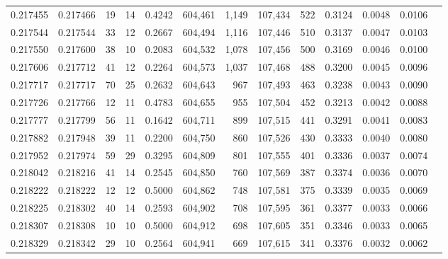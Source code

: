 \begin{tabular}{rrrrrrrrrrrrr}
0.217455 & 0.217466 &    19 &  14 &                                     0.4242 & 604,461 &   1,149 & 107,434 &     522 & 0.3124 & 0.0048 & 0.0106 \\
0.217544 & 0.217544 &    33 &  12 &                                     0.2667 & 604,494 &   1,116 & 107,446 &     510 & 0.3137 & 0.0047 & 0.0103 \\
0.217550 & 0.217600 &    38 &  10 &                                     0.2083 & 604,532 &   1,078 & 107,456 &     500 & 0.3169 & 0.0046 & 0.0100 \\
0.217606 & 0.217712 &    41 &  12 &                                     0.2264 & 604,573 &   1,037 & 107,468 &     488 & 0.3200 & 0.0045 & 0.0096 \\
0.217717 & 0.217717 &    70 &  25 &                                     0.2632 & 604,643 &     967 & 107,493 &     463 & 0.3238 & 0.0043 & 0.0090 \\
0.217726 & 0.217766 &    12 &  11 &                                     0.4783 & 604,655 &     955 & 107,504 &     452 & 0.3213 & 0.0042 & 0.0088 \\
0.217777 & 0.217799 &    56 &  11 &                                     0.1642 & 604,711 &     899 & 107,515 &     441 & 0.3291 & 0.0041 & 0.0083 \\
0.217882 & 0.217948 &    39 &  11 &                                     0.2200 & 604,750 &     860 & 107,526 &     430 & 0.3333 & 0.0040 & 0.0080 \\
0.217952 & 0.217974 &    59 &  29 &                                     0.3295 & 604,809 &     801 & 107,555 &     401 & 0.3336 & 0.0037 & 0.0074 \\
0.218042 & 0.218216 &    41 &  14 &                                     0.2545 & 604,850 &     760 & 107,569 &     387 & 0.3374 & 0.0036 & 0.0070 \\
0.218222 & 0.218222 &    12 &  12 &                                     0.5000 & 604,862 &     748 & 107,581 &     375 & 0.3339 & 0.0035 & 0.0069 \\
0.218225 & 0.218302 &    40 &  14 &                                     0.2593 & 604,902 &     708 & 107,595 &     361 & 0.3377 & 0.0033 & 0.0066 \\
0.218307 & 0.218308 &    10 &  10 &                                     0.5000 & 604,912 &     698 & 107,605 &     351 & 0.3346 & 0.0033 & 0.0065 \\
0.218329 & 0.218342 &    29 &  10 &                                     0.2564 & 604,941 &     669 & 107,615 &     341 & 0.3376 & 0.0032 & 0.0062 \\

\end{tabular}
